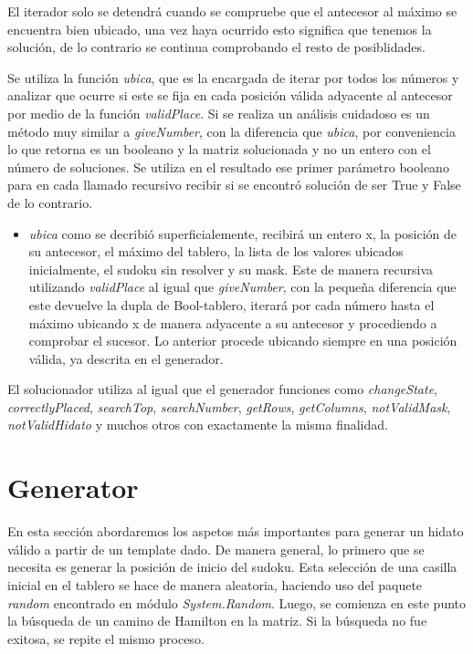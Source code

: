 \documentclass[10pt]{amsart}
\begin{document}
    El iterador solo se detendr\'a cuando se compruebe que el antecesor al m\'aximo se encuentra bien ubicado, una vez haya ocurrido esto significa que tenemos la soluci\'on, de lo contrario se continua comprobando el resto de posiblidades.
	   
    Se utiliza la funci\'on \textit{ubica}, que es la encargada de iterar por todos los n\'umeros y analizar que ocurre si este se fija en cada posici\'on v\'alida adyacente al antecesor por medio de la funci\'on \textit{validPlace}. Si se realiza un an\'alisis cuidadoso es un m\'etodo muy similar a \textit{giveNumber}, con la diferencia que \textit{ubica}, por conveniencia lo que retorna es un booleano y la matriz solucionada y no un entero con el n\'umero de soluciones. Se utiliza en el resultado ese primer parámetro booleano para en cada llamado recursivo recibir si se encontró solución de ser True y False de lo contrario.	
   
   \begin{itemize}
	 \item \textit{ubica} como se decribi\'o superficialemente, recibir\'a un entero x, la posici\'on de su antecesor, el m\'aximo del tablero, la lista de los valores ubicados inicialmente, el sudoku sin resolver y su mask. Este de manera recursiva utilizando \textit{validPlace} al igual que \textit{giveNumber}, con la pequeña diferencia que este devuelve la dupla de Bool-tablero, iterar\'a por cada n\'umero hasta el m\'aximo ubicando x de manera adyacente a su antecesor y procediendo a comprobar el sucesor. Lo anterior procede ubicando siempre en una posici\'on v\'alida, ya descrita en el generador. 	
    \end{itemize}
    
     El solucionador utiliza al igual que el generador funciones como \textit{changeState}, \textit{correctlyPlaced}, \textit{searchTop}, \textit{searchNumber}, \textit{getRows}, \textit{getColumns}, \textit{notValidMask}, \textit{notValidHidato} y muchos otros con exactamente la misma finalidad. 
	
 
    \section*{Generator}

    En esta secci\'on abordaremos los aspetos m\'as importantes para generar un hidato v\'alido a partir de un template dado. De manera general, lo primero que se necesita es generar la posici\'on de inicio del sudoku. Esta selecci\'on de una casilla inicial en el tablero se hace de manera aleatoria, haciendo uso del paquete \textit{random} encontrado en m\'odulo \textit{System.Random}. Luego, se comienza en este punto la b\'usqueda de un camino de Hamilton en la matriz. Si la b\'usqueda no fue exitosa, se repite el mismo proceso. 
\end{document}
